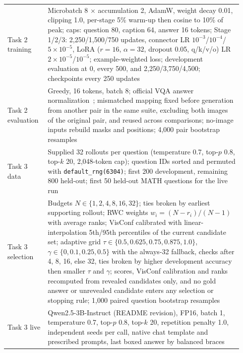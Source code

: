 \documentclass{article}
\begin{document}
\begin{table}[h]
\begin{tabular}{p{0.16\linewidth}p{0.78\linewidth}}
Task 2 training & Microbatch 8 $\times$ accumulation 2, AdamW, weight decay 0.01, clipping 1.0, per-stage 5\% warm-up then cosine to 10\% of peak; caps: question 80, caption 64, answer 16 tokens; Stage 1/2/3: 2,250/1,500/750 updates, connector LR $10^{-3}$/$10^{-4}$/$5\times10^{-5}$, LoRA ($r{=}16$, $\alpha{=}32$, dropout 0.05, q/k/v/o) LR $2\times10^{-5}$/$10^{-5}$; example-weighted loss; development evaluation at 0, every 500, and 2,250/3,750/4,500; checkpoints every 250 updates\\
Task 2 evaluation & Greedy, 16 tokens, batch 8; official VQA answer normalization~\cite{antol2015vqa}; mismatched mapping fixed before generation from another pair in the same suite, excluding both images of the original pair, and reused across comparisons; no-image inputs rebuild masks and positions; 4,000 pair bootstrap resamples\\
Task 3 data & Supplied 32 rollouts per question (temperature 0.7, top-$p$ 0.8, top-$k$ 20, 2,048-token cap); question IDs sorted and permuted with \texttt{default\_rng(6304)}; first 200 development, remaining 800 held-out; first 50 held-out MATH questions for the live run\\
Task 3 selection & Budgets $N\in\{1,2,4,8,16,32\}$; ties broken by earliest supporting rollout; RWC weights $w_i=(N-r_i)/(N-1)$ with average ranks; VisConf calibrated with linear-interpolation 5th/95th percentiles of the current candidate set; adaptive grid $\tau\in\{0.5,0.625,0.75,0.875,1.0\}$, $\gamma\in\{0,0.1,0.25,0.5\}$ with the always-32 fallback, checks after 4, 8, 16, else 32, ties broken by higher development accuracy then smaller $\tau$ and $\gamma$; scores, VisConf calibration and ranks recomputed from revealed candidates only, and no gold answer or unrevealed candidate enters any selection or stopping rule; 1,000 paired question bootstrap resamples\\
Task 3 live & Qwen2.5-3B-Instruct (README revision), FP16, batch 1, temperature 0.7, top-$p$ 0.8, top-$k$ 20, repetition penalty 1.0, independent seeds per call, native chat template and prescribed prompts, last boxed answer by balanced braces\\
\bottomrule
\end{tabular}
\end{table}
\end{document}
